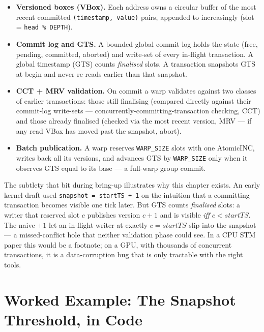 \begin{itemize}
    \item \textbf{Versioned boxes (VBox).} Each address owns a circular buffer of the
          most recent committed \texttt{(timestamp, value)} pairs, appended
          to increasingly (slot = \texttt{head \% DEPTH}).
    \item \textbf{Commit log and GTS.} A bounded global commit log holds the
          state (free, pending, committed, aborted) and write-set of every
          in-flight transaction. A global timestamp (GTS) counts
          \emph{finalised} slots. A transaction snapshots GTS at begin and
          never re-reads earlier than that snapshot.
    \item \textbf{CCT + MRV validation.} On commit a warp validates against
          two classes of earlier transactions: those still finalising
          (compared directly against their commit-log write-sets ---
          concurrently-committing-transaction checking, CCT) and those already
          finalised (checked via the most recent version, MRV --- if any read
          VBox has moved past the snapshot, abort).
    \item \textbf{Batch publication.} A warp reserves \texttt{WARP\_SIZE}
          slots with one AtomicINC, writes back all its versions, and advances
          GTS by \texttt{WARP\_SIZE} only when it observes GTS equal to its
          base --- a full-warp group commit.
\end{itemize}

The subtlety that bit during bring-up illustrates why this chapter exists. An
early kernel draft used \texttt{snapshot = startTS + 1} on the intuition that
a committing transaction becomes visible one tick later. But GTS counts
\emph{finalised} slots: a writer that reserved slot $c$ publishes version
$c+1$ and is visible \emph{iff} $c < startTS$. The naive $+1$ let an
in-flight writer at exactly $c = startTS$ slip into the snapshot --- a
missed-conflict hole that neither validation phase could see. In a CPU STM
paper this would be a footnote; on a GPU, with thousands of concurrent
transactions, it is a data-corruption bug that is only tractable with the
right tools.

\section{Worked Example: The Snapshot Threshold, in Code}
\label{sec:snapshot-example}

